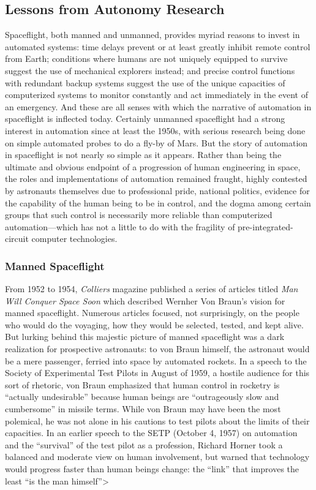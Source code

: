 \subsection{Lessons from Autonomy Research}

Spaceflight, both manned and unmanned, provides myriad reasons to
invest in automated systems: time delays prevent or at least greatly
inhibit remote control from Earth; conditions where humans are not
uniquely equipped to survive suggest the use of mechanical explorers
instead; and precise control functions with redundant backup systems
suggest the use of the unique capacities of computerized systems to
monitor constantly and act immediately in the event of an emergency.
And these are all senses with which the narrative of automation in
spaceflight is inflected today. Certainly unmanned spaceflight had a
strong interest in automation since at least the 1950s, with serious
research being done on simple automated probes to do a fly-by of
Mars.\cite{???-DMsclass} But the story of automation in spaceflight is
not nearly so simple as it appears. Rather than being the ultimate and
obvious endpoint of a progression of human engineering in space, the
roles and implementations of automation remained fraught, highly
contested by astronauts themselves due to professional pride, national
politics, evidence for the capability of the human being to be in
control, and the dogma among certain groups that such control is
necessarily more reliable than computerized automation---which has not
a little to do with the fragility of pre-integrated-circuit computer
technologies.

\subsubsection{Manned Spaceflight}

From 1952 to 1954, \emph{Colliers} magazine published a series of articles
titled \emph{Man Will Conquer Space Soon} which described Wernher Von
Braun's vision for manned spaceflight.\cite{???-wiki} Numerous
articles focused, not surprisingly, on the people who would do the
voyaging, how they would be selected, tested, and kept alive. But
lurking behind this majestic picture of manned spaceflight was a dark
realization for prospective astronauts: to von Braun himself, the
astronaut would be a mere passenger, ferried into space by automated
rockets. In a speech to the Society of Experimental Test Pilots in
August of 1959, a hostile audience for this sort of rhetoric, von
Braun emphasized that human control in rocketry is ``actually
undesirable'' because human beings are ``outrageously slow and
cumbersome'' in missile terms.\cite[p. 66-67]{???-DM} While von Braun
may have been the most polemical, he was not alone in his cautions to
test pilots about the limits of their capacities.
In an earlier speech to the SETP (October 4, 1957) on automation and
the ``survival'' of the test pilot as a profession, Richard Horner
took a balanced and moderate view on human involvement, but warned
that technology would progress faster than human beings change:
the ``link'' that improves the least ``is the man himself''\cite[p. 19]{???-DM}>

